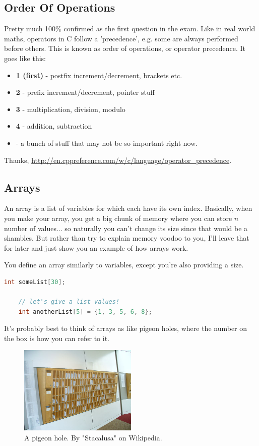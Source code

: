 \subsection{Order Of Operations}
Pretty much 100\% confirmed as the first question in the exam. Like in real world maths, operators in C follow a 'precedence', e.g. some are always performed before others. This is known as order of operations, or operator precedence. It goes like this:
\begin{itemize}
    \item \textbf{1 (first)} - postfix increment/decrement, brackets etc.
    \item \textbf{2} - prefix increment/decrement, pointer stuff
    \item \textbf{3} - multiplication, division, modulo
    \item \textbf{4} - addition, subtraction
    \item {} - a bunch of stuff that may not be so important right now.
\end{itemize}
Thanks, \url{http://en.cppreference.com/w/c/language/operator_precedence}.

\subsection{Arrays}
An array is a list of variables for which each have its own index. Basically, when you make your array, you get a big chunk of memory where you can store $n$ number of values... so naturally you can't change its size since that would be a shambles. But rather than try to explain memory voodoo to you, I'll leave that for later and just show you an example of how arrays work.

You define an array similarly to variables, except you're also providing a size.
\begin{lstlisting}[language=C]
    int someList[30];

    // let's give a list values!
    int anotherList[5] = {1, 3, 5, 6, 8};
\end{lstlisting}

It's probably best to think of arrays as like pigeon holes, where the number on the box is how you can refer to it.

\begin{figure}[h]
    \centering
    \includegraphics[width=0.5\textwidth]{pigeonhole}
    \caption{A pigeon hole. By "Stacalusa" on Wikipedia.}
\end{figure}

